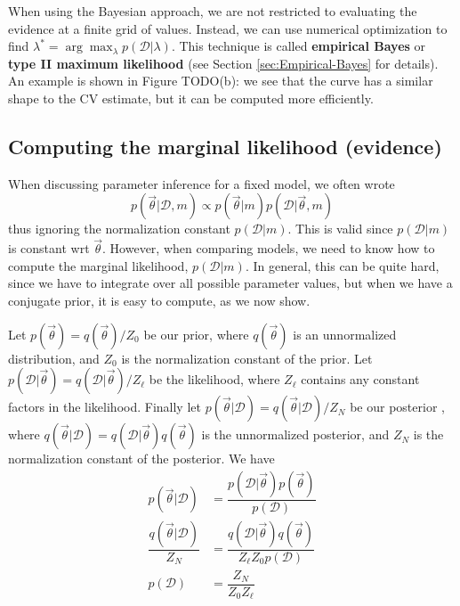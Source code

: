 When using the Bayesian approach, we are not restricted to evaluating the evidence at a finite grid of values. Instead, we can use numerical optimization to find $\lambda^*=\arg\max_{\lambda}p(\mathcal{D}|\lambda)$. This technique is called \textbf{empirical Bayes} or \textbf{type II maximum likelihood} (see Section \ref{sec:Empirical-Bayes} for details). An example is shown in Figure TODO(b): we see that the curve has a similar shape to the CV estimate, but it can be computed more efficiently.


\subsection{Computing the marginal likelihood (evidence)}
\label{sec:Computing-the-marginal-likelihood}
When discussing parameter inference for a fixed model, we often wrote
\begin{equation}
p(\vec{\theta}|\mathcal{D},m) \propto p(\vec{\theta}|m)p(\mathcal{D}|\vec{\theta},m)
\end{equation}
thus ignoring the normalization constant $p(\mathcal{D}|m)$. This is valid since $p(\mathcal{D}|m)$is constant wrt $\vec{\theta}$. However, when comparing models, we need to know how to compute the marginal likelihood, $p(\mathcal{D}|m)$. In general, this can be quite hard, since we have to integrate over all possible parameter values, but when we have a conjugate prior, it is easy to compute, as we now show.

Let $p(\vec{\theta})=q(\vec{\theta})/Z_0$ be our prior, where $q(\vec{\theta})$ is an unnormalized distribution, and $Z_0$ is the normalization constant of the prior. Let $p(\mathcal{D}|\vec{\theta})=q(\mathcal{D}|\vec{\theta})/Z_{\ell}$ be the likelihood, where $Z_{\ell}$ contains any constant factors in the likelihood. Finally let $p(\vec{\theta}|\mathcal{D})=q(\vec{\theta}|\mathcal{D})/Z_N$ be our posterior , where $q(\vec{\theta}|\mathcal{D})=q(\mathcal{D}|\vec{\theta})q(\vec{\theta})$ is the unnormalized posterior, and $Z_N$ is the normalization constant of the posterior. We have
\begin{align}
p(\vec{\theta}|\mathcal{D})& =\dfrac{p(\mathcal{D}|\vec{\theta})p(\vec{\theta})}{p(\mathcal{D})} \\
\dfrac{q(\vec{\theta}|\mathcal{D})}{Z_N}& =\dfrac{q(\mathcal{D}|\vec{\theta})q(\vec{\theta})}{Z_{\ell}Z_0p(\mathcal{D})} \\
p(\mathcal{D})& = \dfrac{Z_N}{Z_0Z_{\ell}}
\end{align}

